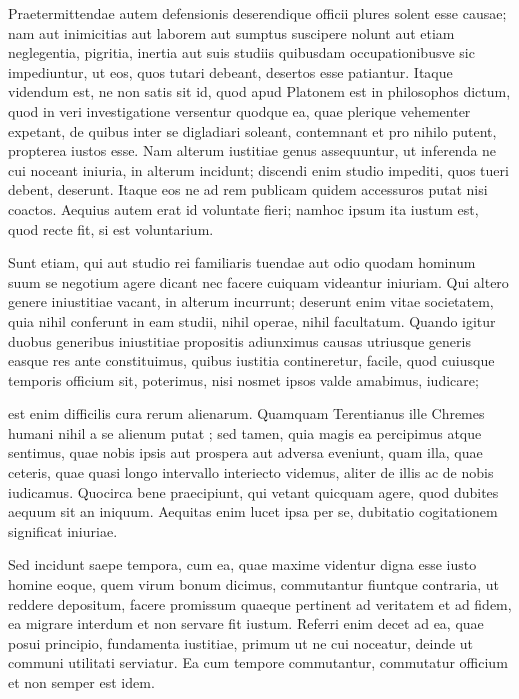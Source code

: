  Praetermittendae autem defensionis deserendique officii plures solent esse causae; nam aut inimicitias aut laborem aut sumptus suscipere nolunt aut etiam neglegentia, pigritia, inertia aut suis studiis quibusdam occupationibusve sic impediuntur, ut eos, quos tutari debeant, desertos esse patiantur. Itaque videndum est, ne non satis sit id, quod apud Platonem est in philosophos dictum, quod in veri investigatione versentur quodque ea, quae plerique vehementer expetant, de quibus inter se digladiari soleant, contemnant et pro nihilo putent, propterea iustos esse. Nam alterum iustitiae genus assequuntur, ut inferenda ne cui noceant iniuria, in alterum incidunt; discendi enim studio impediti, quos tueri debent, deserunt. Itaque eos ne ad rem publicam quidem accessuros putat nisi coactos. Aequius autem erat id voluntate fieri; namhoc ipsum ita iustum est, quod recte fit, si est voluntarium.

 Sunt etiam, qui aut studio rei familiaris tuendae aut odio quodam hominum suum se negotium agere dicant nec facere cuiquam videantur iniuriam. Qui altero genere iniustitiae vacant, in alterum incurrunt; deserunt enim vitae societatem, quia nihil conferunt in eam studii, nihil operae, nihil facultatum. Quando igitur duobus generibus iniustitiae propositis adiunximus causas utriusque generis easque res ante constituimus, quibus iustitia contineretur, facile, quod cuiusque temporis officium sit, poterimus, nisi nosmet ipsos valde amabimus, iudicare;

 est enim difficilis cura rerum alienarum. Quamquam Terentianus ille Chremes humani nihil a se alienum putat ; sed tamen, quia magis ea percipimus atque sentimus, quae nobis ipsis aut prospera aut adversa eveniunt, quam illa, quae ceteris, quae quasi longo intervallo interiecto videmus, aliter de illis ac de nobis iudicamus. Quocirca bene praecipiunt, qui vetant quicquam agere, quod dubites aequum sit an iniquum. Aequitas enim lucet ipsa per se, dubitatio cogitationem significat iniuriae.

 Sed incidunt saepe tempora, cum ea, quae maxime videntur digna esse iusto homine eoque, quem virum bonum dicimus, commutantur fiuntque contraria, ut reddere depositum, facere promissum quaeque pertinent ad veritatem et ad fidem, ea migrare interdum et non servare fit iustum. Referri enim decet ad ea, quae posui principio, fundamenta iustitiae, primum ut ne cui noceatur, deinde ut communi utilitati serviatur. Ea cum tempore commutantur, commutatur officium et non semper est idem.

